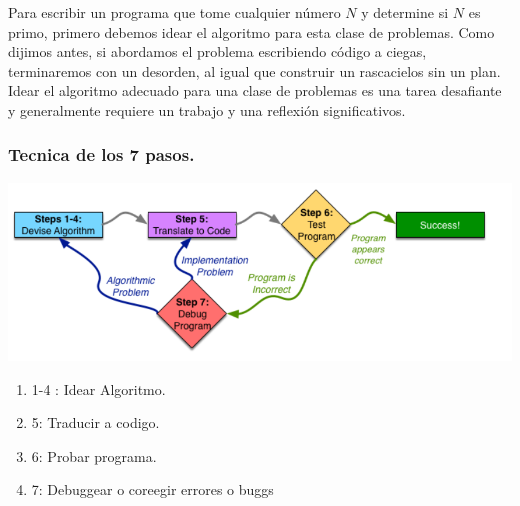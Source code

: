 \documentclass[12pt]{article}
\begin{document}
Para escribir un programa que tome cualquier número $N$ y determine si $N$ es primo, primero debemos idear el algoritmo para esta clase de problemas. Como dijimos antes, si abordamos el problema escribiendo código a ciegas, terminaremos con un desorden, al igual que construir un rascacielos sin un plan. Idear el algoritmo adecuado para una clase de problemas es una tarea desafiante y generalmente requiere un trabajo y una reflexión significativos.\\

{\color{blue} \subsubsection*{\textbf{Tecnica de los 7 pasos.}}}

\textbf{\includegraphics[scale = 0.55]{images/7 pasos.png}}\\

\begin{enumerate}
    \item 1-4 : Idear Algoritmo.
    \item 5: Traducir a codigo.
    \item 6: Probar programa.
    \item 7: Debuggear o coreegir errores o buggs
\end{enumerate}
\end{document}
